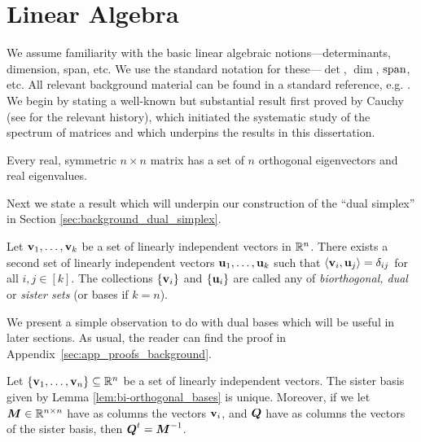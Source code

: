 \section{Linear Algebra}
\label{sec:background_linear} 
We assume familiarity with the basic linear algebraic notions---determinants, dimension, span, etc. We use the standard notation for these---$\det$, $\dim$, $\textnormal{span}$, etc. All relevant background material can be found in a standard reference, e.g. \cite{axler1997linear}. 
We begin by stating a well-known but substantial result first proved by Cauchy (see \cite{hawkins1975cauchy} for the relevant history), which initiated the systematic study of the spectrum of matrices and which underpins the results in this dissertation. 

\begin{theorem}
	\label{thm:spectral_theorem}
	Every real, symmetric $n\times n$ matrix has a set of $n$ orthogonal eigenvectors and real eigenvalues.  
\end{theorem}

Next we state a result which will underpin our construction of the ``dual simplex'' in Section \ref{sec:background_dual_simplex}. 

\begin{lemma}
\label{lem:bi-orthogonal_bases}
Let $\vb{v}_1,\dots,\vb{v}_k$ be a set of linearly independent vectors in $\mathbb{R}^n$. There exists a second set of linearly independent vectors $\vb{u}_1,\dots,\vb{u}_k$ such that $\langle \vb{v}_i,\vb{u}_j\rangle = \delta_{ij}$ for all $i,j\in[k]$. The collections $\{\vb{v}_i\}$ and $\{\vb{u}_i\}$ are called any of \emph{biorthogonal, dual} or \emph{sister sets} (or bases if $k=n$).   
\end{lemma}

We present a simple observation to do with dual bases which will be useful in later sections. As usual, the  reader can find the proof in  Appendix~\ref{sec:app_proofs_background}. 

\begin{observation}
\label{obs:bi-orthogonal_unique}
Let $\{\vb{v}_1,\dots,\vb{v}_n\}\subseteq\mathbb{R}^n$ be a set of linearly independent vectors. The sister basis given by Lemma \ref{lem:bi-orthogonal_bases} is unique. Moreover, if we let ${\vb*{M}}\in\mathbb{R}^{n\times n}$ have as columns the vectors  $\vb{v}_i$, and $\vb*{Q}$ have as columns the vectors  of the  sister basis, then $\vb*{Q}^t={\vb*{M}}^{-1}$.  
\end{observation}

